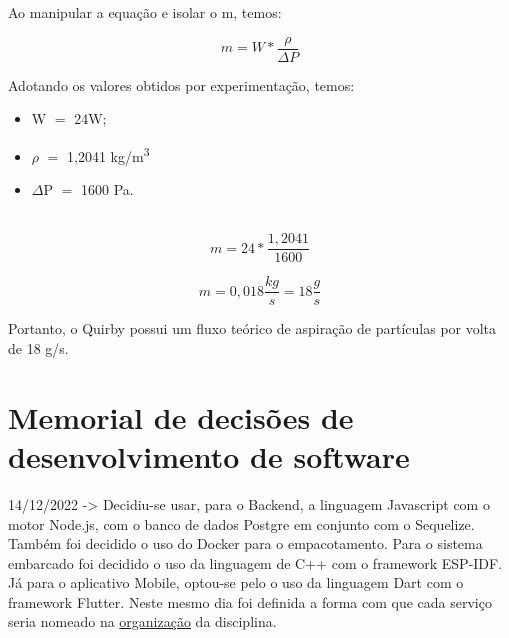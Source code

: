 Ao manipular a equação e isolar o m, temos:

\begin{equation}
m=W\ast\frac{\rho}{\Delta P}
\end{equation}

Adotando os valores obtidos por experimentação, temos:

\begin{itemize}
    \centering
	\item W $=$ 24W;
	\item \(\rho\) $=$ 1,2041 kg/m\textsuperscript{3}
	\item {$\Delta$P} $=$ 1600 Pa.
\end{itemize} \\

\begin{equation}
m=24\ast\frac{1,2041}{1600}
\end{equation}

\begin{equation}
m = 0,018\frac{kg}{s} = 18\frac{g}{s}    
\end{equation}

\vspace{1\baselineskip}
Portanto, o Quirby possui um fluxo teórico de aspiração de partículas por volta de 18 g/s.

\chapter{Memorial de decisões de desenvolvimento de software}

14/12/2022 -> Decidiu-se usar, para o Backend, a linguagem Javascript com o motor Node.js, com o banco de dados Postgre em conjunto com o Sequelize. Também foi decidido o uso do Docker para o empacotamento. Para o sistema embarcado foi decidido o uso da linguagem de C++ com o framework ESP-IDF. Já para o aplicativo Mobile, optou-se pelo o uso da linguagem Dart com o framework Flutter. Neste mesmo dia foi definida a forma com que cada serviço seria nomeado na \href{https://github.com/orgs/PI2-Grupo5/repositories}{organização} da disciplina. 

